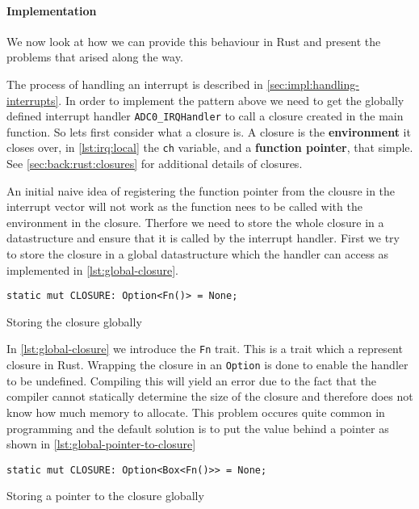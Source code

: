 \paragraph{Implementation}
We now look at how we can provide this behaviour in Rust and present the problems that arised along the way.

The process of handling an interrupt is described in \autoref{sec:impl:handling-interrupts}.
In order to implement the pattern above we need to get the globally defined interrupt handler \texttt{ADC0\_IRQHandler} to call a closure created in the main function.
So lets first consider what a closure is.
A closure is the \textbf{environment} it closes over, in \autoref{lst:irq:local} the \texttt{ch} variable, and a \textbf{function pointer}, that simple.
See \autoref{sec:back:rust:closures} for additional details of closures.

An initial naive idea of registering the function pointer from the clousre in the interrupt vector will not work as the function nees to be called with the environment in the closure.
Therfore we need to store the whole closure in a datastructure and ensure that it is called by the interrupt handler.
First we try to store the closure in a global datastructure which the handler can access as implemented in \autoref{lst:global-closure}.

\begin{listing}[H]
  \begin{verbatim}
static mut CLOSURE: Option<Fn()> = None;
  \end{verbatim}
  \caption{Storing the closure globally}
  \label{lst:global-closure}
\end{listing}

In \autoref{lst:global-closure} we introduce the \texttt{Fn} trait.
This is a trait which a represent closure in Rust.
Wrapping the closure in an \texttt{Option} is done to enable the handler to be undefined.
Compiling this will yield an error due to the fact that the compiler cannot statically determine the size of the closure and therefore does not know how much memory to allocate.
This problem occures quite common in programming and the default solution is to put the value behind a pointer as shown in \autoref{lst:global-pointer-to-closure}

\begin{listing}[H]
  \begin{verbatim}
static mut CLOSURE: Option<Box<Fn()>> = None;
  \end{verbatim}
  \caption{Storing a pointer to the closure globally}
  \label{lst:global-pointer-to-closure}
\end{listing}

